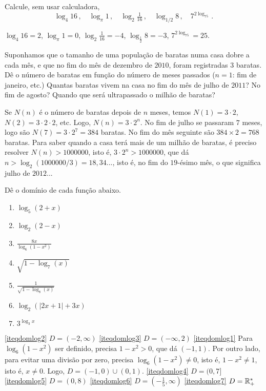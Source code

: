 \begin{exo}
Calcule, sem usar calculadora,
\[ 
\log_4 16\,,\quad
\log_\pi 1\,,\quad
\log_2\tfrac{1}{16}\,,\quad
\log_{1/2}8\,,\quad
7^{2\log_75}\,.
\]
\begin{sol}
$\log_4 16=2$,
$\log_\pi 1=0$,
$\log_2\frac{1}{16}=-4$,
$\log_{\tfrac12}8=-3$,
$7^{2\log_75}=25$.
\end{sol}
\end{exo}

\begin{exo}
Suponhamos que o tamanho de uma população de baratas numa casa dobre a cada mês,
e que no fim do mês de dezembro de $2010$, foram registradas $3$ baratas. 
Dê o número de baratas em função do número de meses passados ($n=1$: fim de
janeiro, etc.)
Quantas baratas vivem na casa no fim do mês de julho de $2011$? No fim de
agosto?
 Quando que será ultrapassado o milhão de baratas?
\begin{sol}
Se $N(n)$ é o número de baratas depois de $n$ meses, temos $N(1)=3\cdot 2$,
$N(2)=3\cdot 2\cdot 2$, etc. Logo, $N(n)=3\cdot 2^n$. No fim de julho se
passaram $7$ meses, logo são $N(7)=3\cdot 2^7=384$ baratas. No fim do mês
seguinte são $384\times 2=768$ baratas. 
Para saber quando a casa terá mais de um milhão de baratas, é preciso resolver
$N(n)>1000000$, isto é, $3\cdot 2^n>1000000$, que dá
$n>\log_2(1000000/3)=18,34...$, 
isto é, no fim do $19$-ésimo mês, o que significa julho de $2012$...
\end{sol}
\end{exo}




\begin{exo} Dê o domínio de cada função abaixo.
\begin{multicols}{3}
\begin{enumerate}
\item \label{iteqdomlog2}
$\log_5(2+x)$
\item\label{iteqdomlog3} $\log_2(2-x)$ 
\item\label{iteqdomlog1}
$\frac{8x}{\log_6(1-x^2)}$
\item\label{iteqdomlog4} $\sqrt{1-\log_7(x)}$
\item\label{iteqdomlog5} $\frac{1}{\sqrt{1-\log_8(x)}}$

\item \label{iteqdomlog6} $\log_2(|2x+1|+3x)$
\item \label{iteqdomlog7} $3^{\log_3 x}$
\end{enumerate}
\end{multicols}
\vspace{0.01cm}
\begin{sol}
\eqref{iteqdomlog2} $D=(-2,\infty)$
\eqref{iteqdomlog3} $D=(-\infty,2)$
\eqref{iteqdomlog1} Para $\log_6(1-x^2)$ ser definido, precisa $1-x^2>0$, que dá
$(-1,1)$. Por outro lado, 
para evitar uma divisão por zero, precisa $\log_6(1-x^2)\neq 0$, isto é,
$1-x^2\neq 1$, isto é, $x\neq 0$. Logo, $D=(-1,0)\cup(0,1)$. 
\eqref{iteqdomlog4} $D=(0,7]$
\eqref{iteqdomlog5} $D=(0,8)$
\eqref{iteqdomlog6} $D=(-\tfrac15,\infty)$
\eqref{iteqdomlog7} $D=\mathbb{R}_+^*$
\end{sol}
\end{exo}


